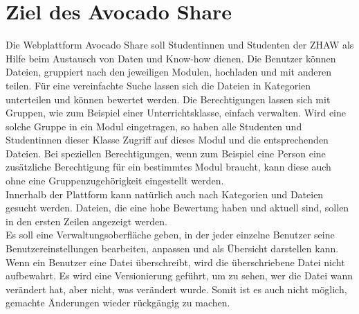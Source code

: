 \section{Ziel des Avocado Share}
Die Webplattform Avocado Share soll Studentinnen und Studenten der ZHAW als Hilfe beim Austausch von Daten und Know-how dienen.
Die Benutzer können Dateien, gruppiert nach den jeweiligen Modulen, hochladen und mit anderen teilen. Für eine vereinfachte Suche lassen sich die Dateien in Kategorien unterteilen und können bewertet werden. Die Berechtigungen lassen sich mit Gruppen, wie zum Beispiel einer Unterrichtsklasse, einfach verwalten. Wird eine solche Gruppe in ein Modul eingetragen, so haben alle Studenten und Studentinnen dieser Klasse Zugriff auf dieses Modul und die entsprechenden Dateien. Bei speziellen Berechtigungen, wenn zum Beispiel eine Person eine zusätzliche Berechtigung für ein bestimmtes Modul braucht, kann diese auch ohne eine Gruppenzugehörigkeit eingestellt werden.\\

Innerhalb der Plattform kann natürlich auch nach Kategorien und Dateien gesucht werden. Dateien, die eine hohe Bewertung haben und aktuell sind, sollen in den ersten Zeilen angezeigt werden. \\
Es soll eine Verwaltungsoberfläche geben, in der jeder einzelne Benutzer seine Benutzereinstellungen bearbeiten, anpassen und als Übersicht darstellen kann. \\
Wenn ein Benutzer eine Datei überschreibt, wird die überschriebene Datei nicht aufbewahrt. Es wird eine Versionierung geführt, um zu sehen, wer die Datei wann verändert hat, aber nicht, was verändert wurde. Somit ist es auch nicht möglich, gemachte Änderungen wieder rückgängig zu machen.